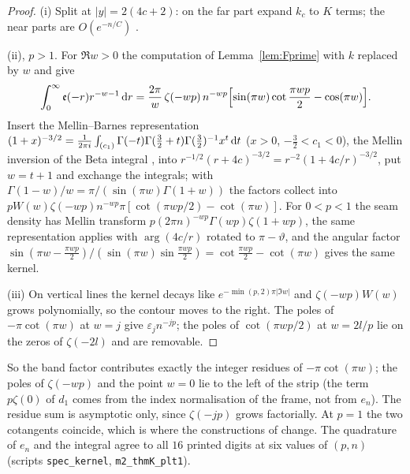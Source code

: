 \begin{proof}
(i) Split at $|y|=2(4c+2)$: on the far part expand $k_c$ to $K$ terms; the near parts are $O(e^{-n/C})$ \cite[Lemmas~8.1(i), 10.1]{PaperII}.

(ii), $p>1$. For $\Re w>0$ the computation of Lemma~\ref{lem:Fprime} with $k$ replaced by $w$ and \cite[(25.4.1)]{DLMF} give
\[
  \int_0^\infty\mathfrak e(-r)r^{-w-1}\,\mathrm{d} r=\frac{2\pi}w\,\zeta(-wp)\,n^{-wp}\Bigl[\sin(\pi w)\cot\frac{\pi wp}2-\cos(\pi w)\Bigr].
\]
Insert the Mellin--Barnes representation $(1+x)^{-3/2}=\frac1{2\pi i}\int_{(c_1)}\Gamma(-t)\Gamma(\frac32+t)\Gamma(\frac32)^{-1}x^t\,\mathrm{d} t$
($x>0$, $-\frac32<c_1<0$), the Mellin inversion of the Beta integral \cite[(5.12.3)]{DLMF}, into $r^{-1/2}(r+4c)^{-3/2}=r^{-2}(1+4c/r)^{-3/2}$, put
$w=t+1$ and exchange the integrals; with $\Gamma(1-w)/w=\pi/(\sin(\pi w)\Gamma(1+w))$ the factors collect into
$pW(w)\zeta(-wp)n^{-wp}\pi[\cot(\pi wp/2)-\cot(\pi w)]$. For $0<p<1$ the seam density has Mellin transform $p(2\pi n)^{-wp}\Gamma(wp)\zeta(1+wp)$,
the same representation applies with $\arg(4c/r)$ rotated to $\pi-\vartheta$, and the angular factor
$\sin(\pi w-\frac{\pi wp}2)/(\sin(\pi w)\sin\frac{\pi wp}2)=\cot\frac{\pi wp}2-\cot(\pi w)$ gives the same kernel.

(iii) On vertical lines the kernel decays like $e^{-\min(p,2)\pi|\Im w|}$ and $\zeta(-wp)W(w)$ grows polynomially, so the contour moves to the
right. The poles of $-\pi\cot(\pi w)$ at $w=j$ give $\varepsilon_jn^{-jp}$; the poles of $\cot(\pi wp/2)$ at $w=2l/p$ lie on the zeros of
$\zeta(-2l)$ and are removable.
\end{proof}

So the band factor contributes exactly the integer residues of $-\pi\cot(\pi w)$; the poles of $\zeta(-wp)$ and the point $w=0$ lie to the
left of the strip (the term $p\zeta(0)$ of $d_1$ comes from the index normalisation of the frame, not from $e_n$). The residue sum is asymptotic
only, since $\zeta(-jp)$ grows factorially. At $p=1$ the two cotangents coincide, which is where the constructions of \cite{PaperII} change.
The quadrature of $e_n$ and the integral agree to all $16$ printed digits at six values of $(p,n)$ (scripts \texttt{spec\_kernel},
\texttt{m2\_thmK\_plt1}).
